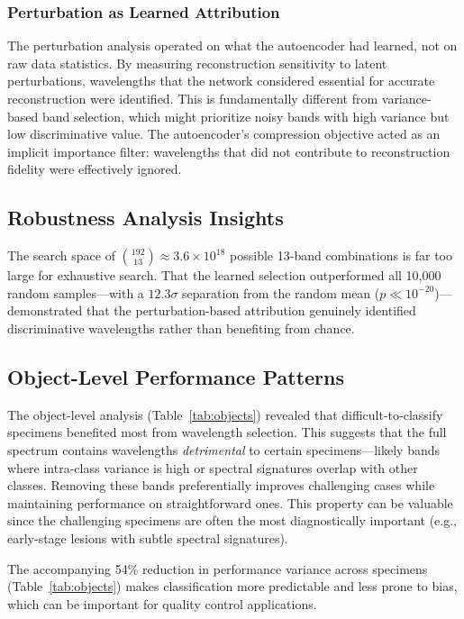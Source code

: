 \subsubsection{Perturbation as Learned Attribution}
The perturbation analysis operated on what the autoencoder had learned, not on raw data statistics.
By measuring reconstruction sensitivity to latent perturbations, wavelengths that the network considered essential for accurate reconstruction were identified.
This is fundamentally different from variance-based band selection, which might prioritize noisy bands with high variance but low discriminative value.
The autoencoder's compression objective acted as an implicit importance filter: wavelengths that did not contribute to reconstruction fidelity were effectively ignored.

\subsection{Robustness Analysis Insights}
\label{sec:discussion_robustness}
The search space of $\binom{192}{13} \approx 3.6 \times 10^{18}$ possible 13-band combinations is far too large for exhaustive search.
That the learned selection outperformed all 10,000 random samples---with a $12.3\sigma$ separation from the random mean ($p \ll 10^{-20}$)---demonstrated that the perturbation-based attribution genuinely identified discriminative wavelengths rather than benefiting from chance.

\subsection{Object-Level Performance Patterns}
\label{sec:discussion_objects}
The object-level analysis (Table~\ref{tab:objects}) revealed that difficult-to-classify specimens benefited most from wavelength selection.
This suggests that the full spectrum contains wavelengths \emph{detrimental} to certain specimens---likely bands where intra-class variance is high or spectral signatures overlap with other classes.
Removing these bands preferentially improves challenging cases while maintaining performance on straightforward ones.
This property can be valuable since the challenging specimens are often the most diagnostically important (e.g., early-stage lesions with subtle spectral signatures).

The accompanying 54\% reduction in performance variance across specimens (Table~\ref{tab:objects}) makes classification more predictable and less prone to bias, which can be important for quality control applications.

